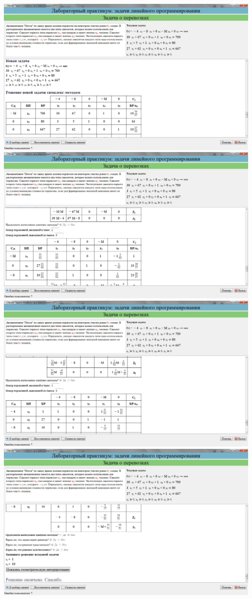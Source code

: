 \includegraphics[width=\linewidth]{om_hw_02/images/1_10.jpg}\\
\includegraphics[width=\linewidth]{om_hw_02/images/1_11.jpg}\\
\includegraphics[width=\linewidth]{om_hw_02/images/1_12.jpg}\\
\includegraphics[width=\linewidth]{om_hw_02/images/1_13.jpg}\\

\pagebreak